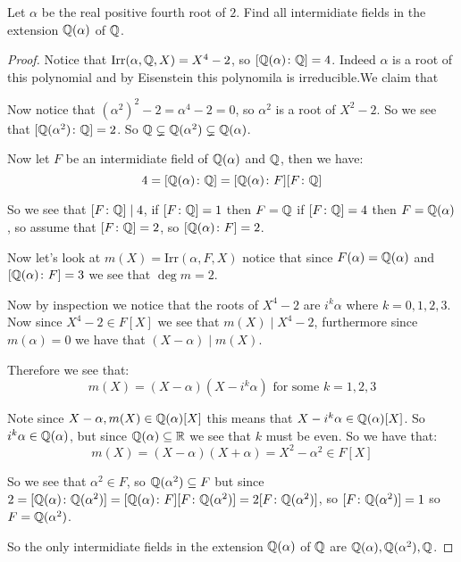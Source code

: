 \begin{exercise}
    Let $\alpha$ be the real positive fourth root of $2$. Find all intermidiate fields in the extension $\mathbb{Q}(\alpha)$ of $\mathbb{Q}$.

    \begin{proof}
        Notice that $\text{Irr}(\alpha,\mathbb{Q},X) = X^4 - 2$, so $[\mathbb{Q}(\alpha)\colon \mathbb{Q}] = 4$. Indeed $\alpha$ is a root of this polynomial and by Eisenstein this polynomila is irreducible.We claim that 
    
        Now notice that ${(\alpha^2)}^2 - 2 = \alpha^4 - 2 = 0$, so $\alpha^2$ is a root of $X^2-2$. So we see that $[\mathbb{Q}(\alpha^2)\colon \mathbb{Q}] = 2$. So $\mathbb{Q} \subsetneq \mathbb{Q}(\alpha^2) \subsetneq \mathbb{Q}(\alpha)$.

        Now let $F$ be an intermidiate field of $\mathbb{Q}(\alpha)$ and $\mathbb{Q}$, then we have:\begin{equation*}
            4 = [\mathbb{Q}(\alpha)\colon \mathbb{Q}] = [\mathbb{Q}(\alpha)\colon F][F\colon \mathbb{Q}] 
        \end{equation*}

        So we see that $[F\colon\mathbb{Q}] \mid 4$, if $[F\colon \mathbb{Q}] = 1$ then $F = \mathbb{Q}$ if $[F\colon \mathbb{Q}] = 4$ then $F = \mathbb{Q}(\alpha)$, so assume that $[F\colon \mathbb{Q}] = 2$, so $[\mathbb{Q}(\alpha)\colon F] = 2$. 


        Now let's look at $m(X) = \text{Irr}(\alpha,F,X)$ notice that since $F(\alpha) = \mathbb{Q}(\alpha)$ and $[\mathbb{Q}(\alpha)\colon F] = 3$ we see that $\deg m = 2$.

        Now by inspection we notice that the roots of $X^4- 2$ are $i^k\alpha$ where $k=0,1,2,3$. Now since $X^4 - 2 \in F[X]$ we see that $m(X)\mid X^4 - 2$, furthermore since $m(\alpha) = 0$ we have that $(X-\alpha)\mid m(X)$.

        Therefore we see that:\begin{equation}
            m(X) = (X-\alpha)(X-i^k\alpha) \text{ for some }k=1,2,3
        \end{equation}

        Note since $X-\alpha, m(X)\in \mathbb{Q}(\alpha)[X]$ this means that $X-i^k\alpha\in \mathbb{Q}(\alpha)[X]$. So $i^k\alpha\in \mathbb{Q}(\alpha)$, but since $\mathbb{Q}(\alpha)\subseteq \mathbb{R}$ we see that $k$ must be even. So we have that:\begin{equation}
            m(X) = (X-\alpha)(X+\alpha) = X^2-\alpha^2 \in F[X]
        \end{equation}

        So we see that $\alpha^2\in F$, so $\mathbb{Q}(\alpha^2)\subseteq F$ but since $2 = [\mathbb{Q}(\alpha)\colon \mathbb{Q}(\alpha^2)] = [\mathbb{Q}(\alpha)\colon F][F\colon \mathbb{Q}(\alpha^2)] = 2[F\colon \mathbb{Q}(\alpha^2)]$, so $[F\colon \mathbb{Q}(\alpha^2)] = 1$ so $F=\mathbb{Q}(\alpha^2)$.

        So the only intermidiate fields in the extension $\mathbb{Q}(\alpha)$ of $\mathbb{Q}$ are $\mathbb{Q}(\alpha), \mathbb{Q}(\alpha^2), \mathbb{Q}$.
    \end{proof}
\end{exercise}


